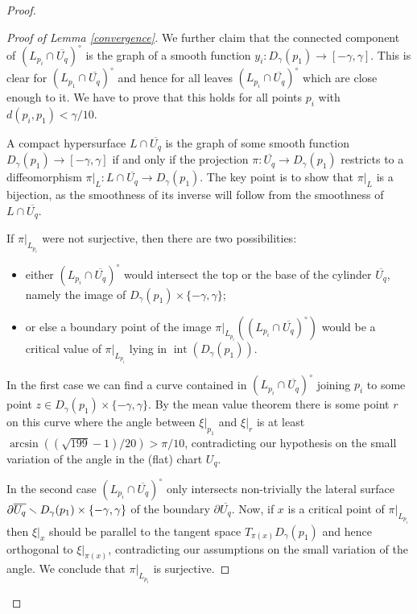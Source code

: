 \documentclass[JEP,XML,SOM,Unicode]{cedram}
\let\moins\smallsetminus
\DeclareMathOperator{\inte}{int}
\theoremstyle{definition}
\theoremstyle{remark}
\numberwithin{equation}{section}
\begin{document}
\begin{proof}
\begin{proof}[Proof of Lemma \ref{convergence}]
We further claim that the connected component of $(L_{p_i}\cap \overline{U_q})^{\circ}$ is
the graph of a smooth function $y_i:D_{\gamma}(p_1)\to [-\gamma,\gamma]$.
This is clear for $(L_{p_1}\cap \overline{U_q})^{\circ}$ and hence for all leaves $(L_{p_i}\cap \overline{U_q})^{\circ}$
which are close enough to it. We have to prove that this holds for
all points $p_i$ with $d(p_i,p_1) <\gamma/10$.

A compact hypersurface $L\cap\overline{U_q}$ is the graph of some smooth function
$D_{\gamma}(p_1)\to [-\gamma,\gamma]$ if and only if the
projection $\pi:\overline{U_q}\to D_{\gamma}(p_1)$ restricts to a diffeomorphism
$\pi|_{L}:L \cap \overline{U_q}\to D_{\gamma}(p_1)$.
The key point is to show that $\pi|_{L}$ is a bijection, as the smoothness of its inverse will follow
from the smoothness of $L\cap\overline{U_q}$.

If $\pi|_{L_{p_i}}$ were not surjective, then there are two possibilities:
\begin{itemize}
\item
either $(L_{p_i}\cap \overline{U_q})^{\circ}$ would intersect the top or the base of the cylinder $\overline{U_q}$, namely the
image of $D_{\gamma}(p_1)\times\{-\gamma,\gamma\}$;
\item
or else a boundary point of the image $\pi|_{L_{p_i}}((L_{p_i}\cap \overline{U_q})^{\circ})$ would be a
critical value of $\pi|_{L_{p_i}}$ lying in $\inte (D_{\gamma}(p_1))$.
\end{itemize}

In the first case we can find a curve contained in $(L_{p_i}\cap \overline{U_q})^{\circ}$ joining $p_i$ to some point $z\in D_{\gamma}(p_1)\times\{-\gamma,\gamma\}$. By the mean value theorem there is some point $r$ on this curve where the angle between $\xi|_{p_1}$ and $\xi|_r$ is at least $\arcsin\left((\sqrt{199}-1)/20\right)> \pi/10$, contradicting our hypothesis on the small variation of the angle in the (flat) chart $U_q$.

In the second case $(L_{p_i}\cap \overline{U_q})^{\circ}$ only intersects non-trivially the lateral surface
$\partial \overline{U_q}\moins\nobreak D_{\gamma}(p_1)\times\{-\gamma,\gamma\}$ of the boundary
$\partial \overline{U_q}$.
Now, if $x$ is a critical point of $\pi|_{L_{p_i}}$ then $\xi|_x$ should be parallel to the tangent space
$T_{\pi(x)}D_{\gamma}(p_1)$ and hence orthogonal to $\xi|_{\pi(x)}$, contradicting our assumptions on
the small variation of the angle.
We conclude that $\pi|_{L_{p_i}}$ is surjective.


\end{proof}
\end{proof}
\end{document}
